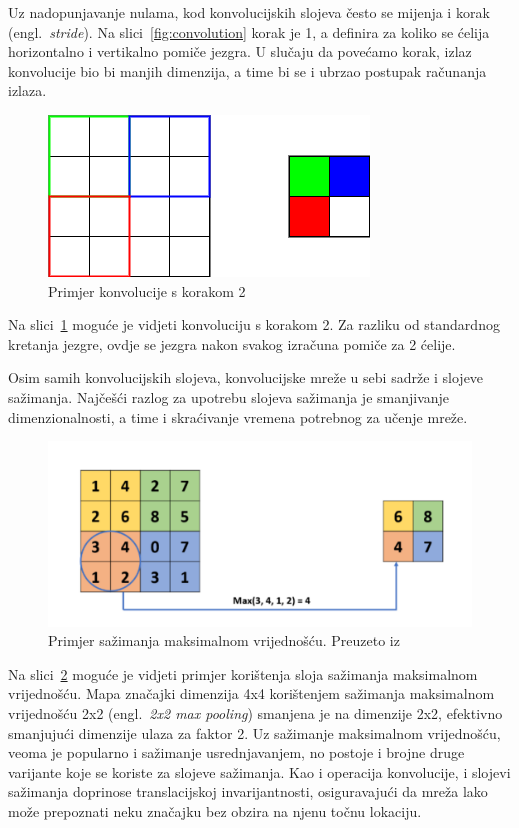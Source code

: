 \documentclass[times, utf8, zavrsni, numeric]{fer}
\begin{document}
Uz nadopunjavanje nulama, kod konvolucijskih slojeva često se mijenja i korak (engl.\ \textit{stride}). 
Na slici~\ref{fig:convolution} korak je 1, a definira za koliko se ćelija horizontalno i vertikalno pomiče jezgra. 
U slučaju da povećamo korak, izlaz konvolucije bio bi manjih dimenzija, a time bi se i ubrzao postupak računanja izlaza.
\begin{figure}[htb]
    \centering
    \includegraphics[scale=0.5]{stride.png}
    \caption{Primjer konvolucije s korakom 2}
    \label{fig:stride}
\end{figure}

Na slici~\ref{fig:stride} moguće je vidjeti konvoluciju s korakom 2. Za razliku od standardnog kretanja jezgre, ovdje se jezgra nakon svakog izračuna pomiče za 2 ćelije. 

Osim samih konvolucijskih slojeva, konvolucijske mreže u sebi sadrže i slojeve sažimanja. 
Najčešći razlog za upotrebu slojeva sažimanja je smanjivanje dimenzionalnosti, a time i skraćivanje vremena potrebnog za učenje mreže.

\begin{figure}[htb]
    \centering
    \includegraphics[scale=0.35]{maxpool.png}
    \caption{Primjer sažimanja maksimalnom vrijednošću. Preuzeto iz \cite{gholamalinezhad2020pooling}}
    \label{fig:maxpool}
\end{figure}

Na slici~\ref{fig:maxpool} moguće je vidjeti primjer korištenja sloja sažimanja maksimalnom vrijednošću.
Mapa značajki dimenzija 4x4 korištenjem sažimanja maksimalnom vrijednošću 2x2 (engl.\ \textit{2x2 max pooling}) smanjena je na dimenzije 2x2, efektivno smanjujući dimenzije ulaza za faktor 2.
Uz sažimanje maksimalnom vrijednošću, veoma je popularno i sažimanje usrednjavanjem, no postoje i brojne druge varijante koje se koriste za slojeve sažimanja.
Kao i operacija konvolucije, i slojevi sažimanja doprinose translacijskoj invarijantnosti, osiguravajući da mreža lako može prepoznati neku značajku bez obzira na njenu točnu lokaciju.
\end{document}
